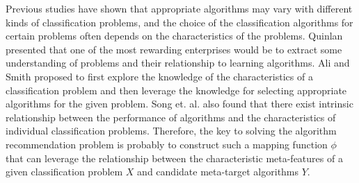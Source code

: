 \documentclass[acmsmall]{acmart}
\begin{document}
Previous studies have shown that appropriate algorithms may vary with different kinds of classification problems,
and the choice of the classification algorithms for certain problems often depends on the characteristics of the problems.
Quinlan \cite{quinlan1994comparing} presented that one of the most rewarding enterprises would be
to extract some understanding of problems and their relationship to learning algorithms.
Ali and Smith \cite{ali2006learning} proposed to first explore the knowledge of the characteristics of a classification problem and then leverage the knowledge for selecting appropriate algorithms for the given problem.
Song et. al. \cite{song2012automatic} also found that there exist intrinsic relationship between the performance of algorithms
and the characteristics of individual classification problems.
Therefore,
the key to solving the algorithm recommendation problem is probably to construct such a mapping function $\phi$ that can leverage the relationship between the characteristic meta-features of a given classification problem $X$ and candidate meta-target algorithms $Y$.





\end{document}
